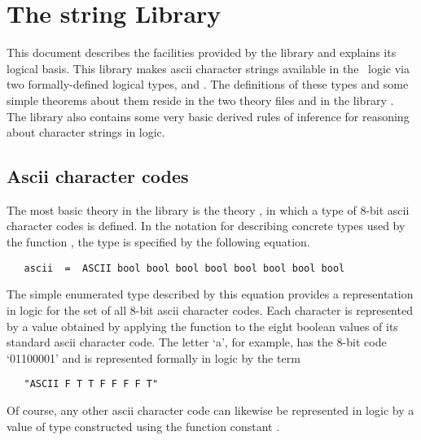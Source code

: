 \chapter{The string Library}

\newcommand\ptt{\tt}

This document describes the facilities provided by the  library and
explains its logical basis. This library makes ascii character strings
available in the \HOL\ logic via two formally-defined logical types, 
and . The definitions of these types and some simple theorems about
them reside in the two theory files  and  in the
library .  The library also contains some very basic derived rules
of inference for reasoning about character strings in logic.

\section{Ascii character codes}

The most basic theory in the library is the theory , in which a type
 of 8-bit ascii character codes is defined.  In the notation for
describing concrete types used by the function , the type
 is specified by the following equation.

\begin{hol}\begin{verbatim}
   ascii  =  ASCII bool bool bool bool bool bool bool bool
\end{verbatim}\end{hol}

\noindent The simple enumerated type  described by this equation
provides a representation in logic for the set of all 8-bit ascii character
codes.  Each character is represented by a value obtained by applying the
function  to the eight boolean values of its standard ascii character
code.  The letter `a', for example, has the 8-bit code `01100001' and is
represented formally in logic by the term

\begin{hol}\begin{verbatim}
   "ASCII F T T F F F F T"
\end{verbatim}\end{hol}

\noindent Of course, any other ascii character code can likewise be represented
in logic by a value of type  constructed using the function constant
.

